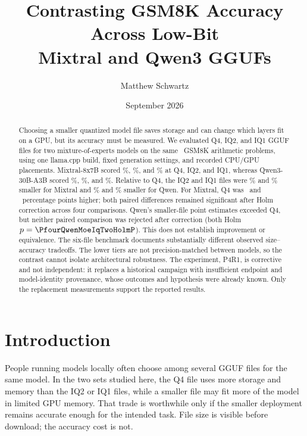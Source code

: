 \documentclass[11pt]{article}
\title{\textbf{Contrasting GSM8K Accuracy Across Low-Bit\\
Mixtral and Qwen3 GGUFs}}
\author{Matthew Schwartz\singleauthorinfo{Independent researcher \enspace
\href{https://orcid.org/0009-0009-4171-7247}{ORCID 0009-0009-4171-7247}
\enspace \texttt{matthew.schwartz.research@gmail.com}}}
\date{September 2026}
\begin{document}
\maketitle

\begin{abstract}
Choosing a smaller quantized model file saves storage and can change which
layers fit on a GPU, but its accuracy must be measured. We evaluated Q4, IQ2,
and IQ1 GGUF files for two mixture-of-experts models on the same
\PfourPrimaryItemCount\ GSM8K arithmetic problems, using one llama.cpp build,
fixed generation settings, and recorded CPU/GPU placements. Mixtral-8x7B scored
\PfourMixtralHealthyAccuracyPct\%, \PfourMixtralIqTwoAccuracyPct\%, and
\PfourMixtralIqOneAccuracyPct\% at Q4, IQ2, and IQ1, whereas
Qwen3-30B-A3B scored \PfourQwenMoeHealthyAccuracyPct\%,
\PfourQwenMoeIqTwoAccuracyPct\%, and \PfourQwenMoeIqOneAccuracyPct\%.
Relative to Q4, the IQ2 and IQ1 files were
\PfourSizeReductionPct{\PfourMixtralIqTwoFileBytes}{\PfourMixtralHealthyFileBytes}\%
and
\PfourSizeReductionPct{\PfourMixtralIqOneFileBytes}{\PfourMixtralHealthyFileBytes}\%
smaller for Mixtral and
\PfourSizeReductionPct{\PfourQwenMoeIqTwoFileBytes}{\PfourQwenMoeHealthyFileBytes}\%
and
\PfourSizeReductionPct{\PfourQwenMoeIqOneFileBytes}{\PfourQwenMoeHealthyFileBytes}\%
smaller for Qwen. For Mixtral, Q4 was
\PfourMixtralIqTwoDeltaPp\ and \PfourMixtralIqOneDeltaPp\ percentage points
higher; both paired differences remained significant after Holm correction
across four comparisons. Qwen's smaller-file point estimates exceeded Q4, but
neither paired comparison was rejected after correction (both Holm
$p=\PfourQwenMoeIqTwoHolmP$). This does not establish improvement or
equivalence. The six-file benchmark documents substantially different
observed size--accuracy tradeoffs. The lower tiers are not precision-matched
between models, so the contrast cannot isolate architectural robustness.
The experiment, P4R1, is corrective and not independent: it replaces a
historical campaign with insufficient endpoint and model-identity provenance,
whose outcomes and hypothesis were already known. Only the replacement
measurements support the reported results.
\end{abstract}

\section{Introduction}

People running models locally often choose among several GGUF files for the
same model. In the two sets studied here, the Q4 file uses more storage and
memory than the IQ2 or IQ1 files, while a smaller file may fit more of the
model in limited GPU memory. That trade is worthwhile only if the smaller
deployment remains accurate enough for the intended task. File size is visible
before download; the accuracy cost is not.
\end{document}
